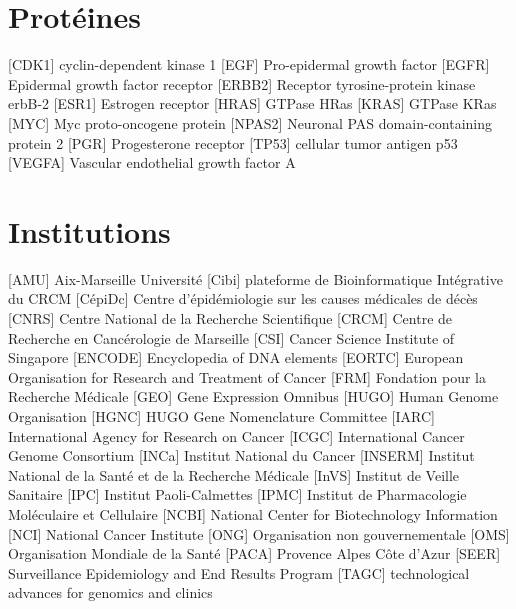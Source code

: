	\section{\textcolor{white!15!black}{Protéines}}\label{app:ac:protéines}
		\begin{acronym}[CDKN2A]
				[CDK1]	{cyclin-dependent kinase 1}
					[EGF]	{Pro-epidermal growth factor}
				[EGFR]	{Epidermal growth factor receptor}
				[ERBB2]	{Receptor tyrosine-protein kinase erbB-2}
				[ESR1]	{Estrogen receptor}
				[HRAS]	{GTPase HRas}
				[KRAS]	{GTPase KRas}
					[MYC]	{Myc proto-oncogene protein}
				[NPAS2]	{Neuronal PAS domain-containing protein 2}
					[PGR]	{Progesterone receptor}
				[TP53]	{cellular tumor antigen p53}
				[VEGFA]	{Vascular endothelial growth factor A}
		\end{acronym}

	\section{\textcolor{white!15!black}{Institutions}}
		\begin{acronym}[CDKN2A]
					[AMU]		{Aix-Marseille Université}
					[Cibi]		{plateforme de Bioinformatique Intégrative du \acs{CRCM}}
				[CépiDc]	{Centre d'épidémiologie sur les causes médicales de décès}
					[CNRS]		{Centre National de la Recherche Scientifique}
					[CRCM]		{Centre de Recherche en Cancérologie de Marseille}
					[CSI]		{Cancer Science Institute of Singapore}
				[ENCODE]	{Encyclopedia of \acs{DNA} elements}
					{European Organisation for Research and Treatment of Cancer}
					[FRM]		{Fondation pour la Recherche Médicale}
					[GEO]		{Gene Expression Omnibus}
					[HUGO]		{Human Genome Organisation}
					[HGNC]		{\acs{HUGO} Gene Nomenclature Committee}
					[IARC]		{International Agency for Research on Cancer}
					[ICGC]		{International Cancer Genome Consortium}
					[INCa]		{Institut National du Cancer}
				[INSERM]	{Institut National de la Santé et de la Recherche Médicale}
					[InVS]		{Institut de Veille Sanitaire}
					[IPC]		{Institut Paoli-Calmettes}
					[IPMC]		{Institut de Pharmacologie Moléculaire et Cellulaire}
					[NCBI]		{National Center for Biotechnology Information}
					[NCI]		{National Cancer Institute}
					[ONG]		{Organisation non gouvernementale}
					[OMS]		{Organisation Mondiale de la Santé}
					[PACA]		{Provence Alpes Côte d'Azur}
					[SEER]		{Surveillance Epidemiology and End Results Program}
					[TAGC]		{technological advances for genomics and clinics}
		\end{acronym}

